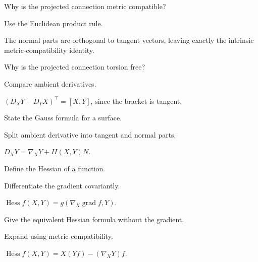 \begin{exercise}\label{exr:vii22-16}
Why is the projected connection metric compatible?
\end{exercise}
\begin{hint}
Use the Euclidean product rule.
\end{hint}
\begin{solution}
The normal parts are orthogonal to tangent vectors, leaving exactly the intrinsic metric-compatibility identity.
\end{solution}


\begin{exercise}\label{exr:vii22-17}
Why is the projected connection torsion free?
\end{exercise}
\begin{hint}
Compare ambient derivatives.
\end{hint}
\begin{solution}
\((D_XY-D_YX)^\top=[X,Y]\), since the bracket is tangent.
\end{solution}


\begin{exercise}\label{exr:vii22-18}
State the Gauss formula for a surface.
\end{exercise}
\begin{hint}
Split ambient derivative into tangent and normal parts.
\end{hint}
\begin{solution}
\(D_XY=\nabla_XY+II(X,Y)N\).
\end{solution}


\begin{exercise}\label{exr:vii22-19}
Define the Hessian of a function.
\end{exercise}
\begin{hint}
Differentiate the gradient covariantly.
\end{hint}
\begin{solution}
\(\operatorname{Hess}f(X,Y)=g(\nabla_X\operatorname{grad}f,Y)\).
\end{solution}


\begin{exercise}\label{exr:vii22-20}
Give the equivalent Hessian formula without the gradient.
\end{exercise}
\begin{hint}
Expand using metric compatibility.
\end{hint}
\begin{solution}
\(\operatorname{Hess}f(X,Y)=X(Yf)-(\nabla_XY)f\).
\end{solution}


